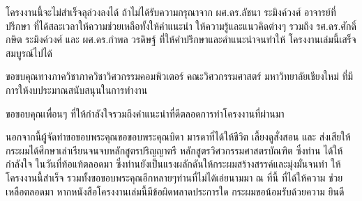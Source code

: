 \iffalse
\begin{dedication}
This document is dedicated to all Chiang Mai University students.

Dedication page is optional.
\end{dedication}
\fi %

\begin{acknowledgments}
    \quad \quad  โครงงานนี้จะไม่สำเร็จลุล่วงลงได้ ถ้าไม่ได้รับความกรุณาจาก ผศ.ดร.ลัชนา ระมิงค์วงศ์
    อาจารย์ที่ปรึกษา ที่ได้สละเวลาให้ความช่วยเหลือทั้งให้คำแนะนำ ให้ความรู้และแนวคิดต่างๆ รวมถึง
    รศ.ดร.ศักดิ์กษิต ระมิงค์วงศ์ และ ผศ.ดร.กําพล วรดิษฐ์ ที่ให้คำปรึกษาและคำแนะนำจนทำให้
    โครงงานเล่มนี้เสร็จสมบูรณ์ไปได้
    \newline

    ขอขบคุณทางภาควิชาภาควิชาวิศวกรรมคอมพิวเตอร์ คณะวิศวกรรมศาสตร์
มหาวิทยาลัยเชียงใหม่ ที่มีการให้งบประมาณสนับสนุนในการทำงาน
\newline

ขอขอบคุณเพื่อนๆ ที่ให้กำลังใจรวมถึงคำแนะนำที่ดีตลอดการทำโครงงานที่ผ่านมา
\newline

    นอกจากนี้ผู้จัดทำขอขอบพระคุณขอขอบพระคุณบิดา มารดาที่ได้ให้ชีวิต เลี้ยงดูสั่งสอน และ
ส่งเสียให้กระผมได้ศึกษาเล่าเรียนจนจบหลักสูตรปริญญาตรี หลักสูตรวิศวกรรมศาสตรบัณฑิต ซึ่งท่าน
ได้ให้กำลังใจ ในวันที่ท้อแท้ตลอดมา ซึ่งท่านยังเป็นแรงผลักดันให้กระผมสร้างสรรค์และมุ่งมั่นจนทำ
ให้โครงงานนี้สำเร็จ รวมทั้งขอขอบพระคุณอีกหลายๆท่านที่ไม่ได้เอ่ยนามมา ณ ที่นี้ ที่ได้ให้ความ
ช่วยเหลือตลอดมา หากหนังสือโครงงานเล่มนี้มีข้อผิดพลาดประการใด กระผมขอน้อมรับด้วยความ
ยินดี

    

\end{acknowledgments}%
\fi %

\contentspage

\ifproject
\figurelistpage

\tablelistpage
\fi %



